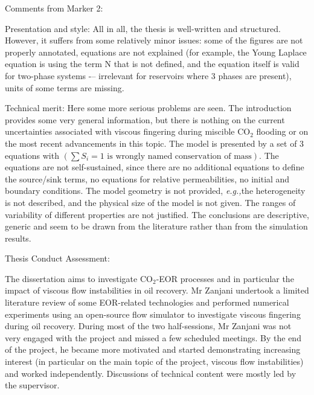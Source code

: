 \documentclass[14pt,twoside]{report}
\newcommand{\eg}{{\it e.g.,}}
\begin{document}
\bigskip

\noindent
    {\Large Comments from Marker 2:}

\noindent
Presentation and style: All in all, the thesis is well-written and structured. However, it suffers from some relatively minor issues: some of the figures are not properly annotated, equations are not explained (for example, the Young Laplace equation is using the term N that is not defined, and the equation itself is valid for two-phase systems -– irrelevant for reservoirs where 3 phases are present), units of some terms are missing.

Technical merit: Here some more serious problems are seen. The introduction provides some very general information, but there is nothing on the current uncertainties associated with viscous fingering during miscible CO$_{2}$ flooding or on the most recent advancements in this topic. The model is presented by a set of 3 equations with $\left(\sum S_{i}=1 \text{ is wrongly named conservation of mass}\right)$. The equations are not self-sustained, since there are no additional equations to define the source/sink terms, no equations for relative permeabilities, no initial and boundary conditions. The model geometry is not provided, \eg the heterogeneity is not described, and the physical size of the model is not given. The ranges of variability of different properties are not justified. The conclusions are descriptive, generic and seem to be drawn from the literature rather than from the simulation results.


\clearpage

{\Large Thesis Conduct Assessment:}

\noindent
The dissertation aims to investigate CO$_{2}$-EOR processes and in particular the impact of viscous flow instabilities in oil recovery. Mr Zanjani undertook a limited literature review of some EOR-related technologies and performed numerical experiments using an open-source flow simulator to investigate viscous fingering during oil recovery.  During most of the two half-sessions, Mr Zanjani was not very engaged with the project and missed a few scheduled meetings. By the end of the project, he became more motivated and started demonstrating increasing interest (in particular on the main topic of the project, viscous flow instabilities) and worked independently. Discussions of technical content were mostly led by the supervisor. 


\clearpage

\end{document}
